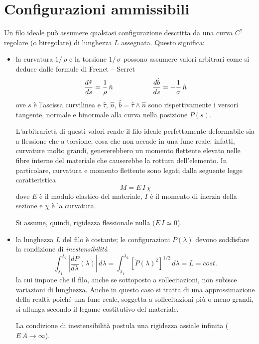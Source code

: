 \section*{Configurazioni ammissibili}
Un filo ideale può assumere qualsiasi configurazione descritta da una curva $C^2$ regolare (o biregolare) di lunghezza $L$ assegnata. Questo significa:
\begin{itemize}
	\item la curvatura $1/\,\rho$ e la torsione $1/\,\sigma$ possono assumere valori arbitrari come si deduce dalle formule di Frenet -- Serret
	\begin{equation*}
		\dfrac{d\hat{\tau}}{ds} = \dfrac{1}{\rho}\,\hat{n} \hspace*{2cm} \dfrac{d\hat{b}}{ds} = - \dfrac{1}{\sigma}\,\hat{n}
	\end{equation*}
	ove $s$ è l'ascissa curvilinea e $\hat{\tau}$, $\hat{n}$, $\hat{b} = \hat{\tau} \wedge \hat{n}$ sono rispettivamente i versori tangente, normale e binormale alla curva nella posizione $P(s)$.

	L'arbitrarietà di questi valori rende il filo ideale perfettamente deformabile sia a flessione che a torsione, cosa che non accade in una fune reale: infatti, curvature molto grandi, genererebbero un momento flettente elevato nelle fibre interne del materiale che causerebbe la rottura dell'elemento. In particolare, curvatura e momento flettente sono legati dalla seguente legge caratteristica
	\[
	M = E\,I\,\chi
	\]
	dove $E$ è il modulo elastico del materiale, $I$ è il momento di inerzia della sezione e $\chi$ è la curvatura.

	Si assume, quindi, rigidezza flessionale nulla ($E\,I\simeq 0$).
	\item la lunghezza $L$ del filo è costante; le configurazioni $P(\lambda)$ devono soddisfare la condizione di \emph{inestensibilità}
	\[
	\int_{\lambda_1}^{\lambda_2} \left| \dfrac{dP}{d\lambda}(\lambda) \right|\,d\lambda = \int_{\lambda_1}^{\lambda_2} [\dot{P}(\lambda)^2]^{1/2}\, d\lambda = L = cost.
	\]
	la cui impone che il filo, anche se sottoposto a sollecitazioni, non subisce variazioni di lunghezza. Anche in questo caso si tratta di una approssimazione della realtà poiché una fune reale, soggetta a sollecitazioni più o meno grandi, si allunga secondo il legame costitutivo del materiale.

	La condizione di inestensibilità postula una rigidezza assiale infinita ($E\,A \to \infty$).
\end{itemize}

